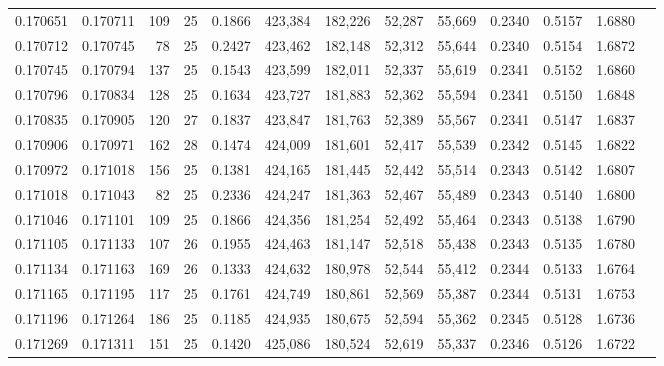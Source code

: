 \begin{tabular}{rrrrrrrrrrrrr}
0.170651 & 0.170711 & 109 &  25 &                                     0.1866 & 423,384 & 182,226 &  52,287 &  55,669 & 0.2340 & 0.5157 & 1.6880 \\
0.170712 & 0.170745 &  78 &  25 &                                     0.2427 & 423,462 & 182,148 &  52,312 &  55,644 & 0.2340 & 0.5154 & 1.6872 \\
0.170745 & 0.170794 & 137 &  25 &                                     0.1543 & 423,599 & 182,011 &  52,337 &  55,619 & 0.2341 & 0.5152 & 1.6860 \\
0.170796 & 0.170834 & 128 &  25 &                                     0.1634 & 423,727 & 181,883 &  52,362 &  55,594 & 0.2341 & 0.5150 & 1.6848 \\
0.170835 & 0.170905 & 120 &  27 &                                     0.1837 & 423,847 & 181,763 &  52,389 &  55,567 & 0.2341 & 0.5147 & 1.6837 \\
0.170906 & 0.170971 & 162 &  28 &                                     0.1474 & 424,009 & 181,601 &  52,417 &  55,539 & 0.2342 & 0.5145 & 1.6822 \\
0.170972 & 0.171018 & 156 &  25 &                                     0.1381 & 424,165 & 181,445 &  52,442 &  55,514 & 0.2343 & 0.5142 & 1.6807 \\
0.171018 & 0.171043 &  82 &  25 &                                     0.2336 & 424,247 & 181,363 &  52,467 &  55,489 & 0.2343 & 0.5140 & 1.6800 \\
0.171046 & 0.171101 & 109 &  25 &                                     0.1866 & 424,356 & 181,254 &  52,492 &  55,464 & 0.2343 & 0.5138 & 1.6790 \\
0.171105 & 0.171133 & 107 &  26 &                                     0.1955 & 424,463 & 181,147 &  52,518 &  55,438 & 0.2343 & 0.5135 & 1.6780 \\
0.171134 & 0.171163 & 169 &  26 &                                     0.1333 & 424,632 & 180,978 &  52,544 &  55,412 & 0.2344 & 0.5133 & 1.6764 \\
0.171165 & 0.171195 & 117 &  25 &                                     0.1761 & 424,749 & 180,861 &  52,569 &  55,387 & 0.2344 & 0.5131 & 1.6753 \\
0.171196 & 0.171264 & 186 &  25 &                                     0.1185 & 424,935 & 180,675 &  52,594 &  55,362 & 0.2345 & 0.5128 & 1.6736 \\
0.171269 & 0.171311 & 151 &  25 &                                     0.1420 & 425,086 & 180,524 &  52,619 &  55,337 & 0.2346 & 0.5126 & 1.6722 \\

\end{tabular}
